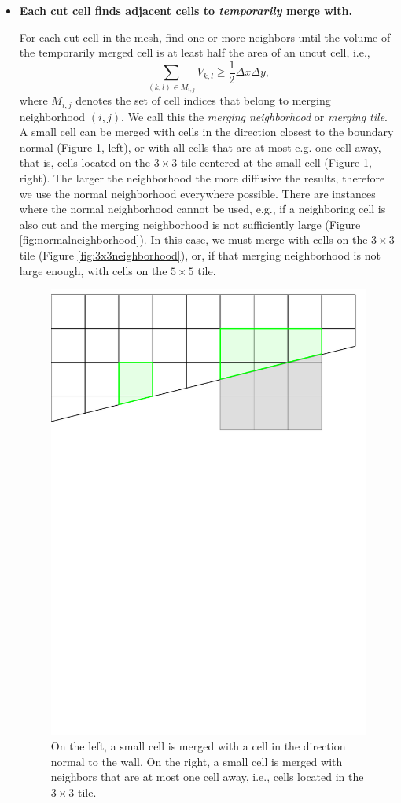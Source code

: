 \begin{itemize}
\item
{\bf Each cut cell finds adjacent cells to {\em temporarily} merge with.}

\vspace*{.1in}
For each cut cell in the mesh, find  one or more neighbors until the
volume of the temporarily merged cell is at least half the area of an uncut cell, i.e., 
\begin{equation} \label{eq:vmerge}
\sum_{(k,l) \in M_{i,j}} V_{k,l} \geq \frac{1}{2}\Delta x\Delta y,
\end{equation}
where $M_{i,j}$ denotes the set of cell indices that belong to merging neighborhood $(i,j)$.
We call this the 
{\em  merging neighborhood} or {\em merging tile}.  
A small cell can be merged with cells in the direction closest to the boundary normal (Figure \ref{fig:neighborhoods}, left), or with all cells that are at most e.g. one cell away, that is, cells located on the $3 \times 3$ tile centered at the small cell (Figure \ref{fig:neighborhoods}, right).
The larger the neighborhood the more diffusive the results, therefore we use the normal neighborhood everywhere possible.
There are instances where the normal neighborhood cannot be used, e.g., if a neighboring cell is also cut and the
merging neighborhood is not sufficiently large (Figure \ref{fig:normalneighborhood}).  In this case, we must merge with cells on the $3\times3$ tile (Figure \ref{fig:3x3neighborhood}), or, if that merging neighborhood is not large enough, with cells on the $5 \times 5$ tile.

\begin{figure}
    \centering
    \includegraphics[width=0.5\linewidth]{figs/neighborhoods.pdf}
    \caption{\sf On the left, a small cell is merged with a cell in the direction 
    normal to  the wall.  On the right, a small cell is merged with neighbors that are at most one cell away, i.e., cells located in the $3\times3$ tile.}
    \label{fig:neighborhoods}
\end{figure}


\end{itemize}
